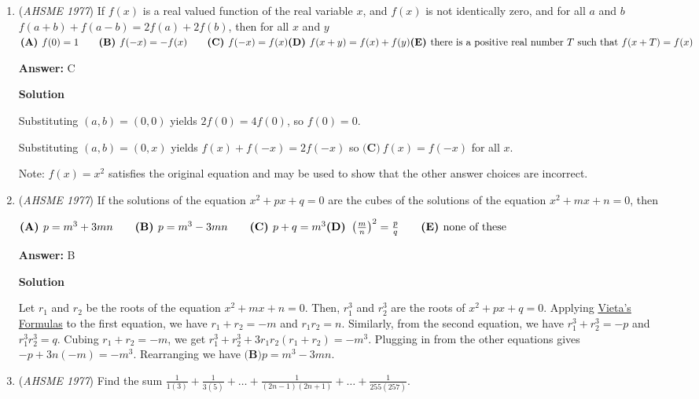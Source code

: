\begin{enumerate}
	\item (\textit{AHSME 1977}) If $f(x)$ is a real valued function of the real variable $x$, and $f(x)$ is not identically zero, 
and for all $a$ and $b$ $f(a+b)+f(a-b)=2f(a)+2f(b)$, then for all $x$ and $y$
$\textbf{(A) }f(0)=1\qquad \textbf{(B) }f(-x)=-f(x)\qquad \textbf{(C) }f(-x)=f(x)\qquad \\ \textbf{(D) }f(x+y)=f(x)+f(y) \qquad \\ \textbf{(E) }\text{there is a positive real number }T\text{ such that }f(x+T)=f(x)$

 \textbf{Answer: }C



\textbf{Solution}

Substituting $(a,b)=(0,0)$ yields $2f(0)=4f(0)$, so $f(0)=0$.

 Substituting $(a,b)=(0,x)$ yields $f(x)+f(-x)=2f(-x)$ so $\boxed{\textbf{(C)}\ f(x)=f(-x)}$ for all $x$.

 Note: $f(x) = x^2$ satisfies the original equation and may be used to show that the other answer choices are incorrect.

 


	\item (\textit{AHSME 1977}) If the solutions of the equation $x^2+px+q=0$ are the cubes of the solutions of the equation $x^2+mx+n=0$, then


 $\textbf{(A) }p=m^3+3mn\qquad \textbf{(B) }p=m^3-3mn\qquad \textbf{(C) }p+q=m^3\qquad\\ \textbf{(D) }\left(\frac{m}{n}\right)^2=\frac{p}{q}\qquad  \textbf{(E) }\text{none of these}$

 \textbf{Answer: }B



\textbf{Solution}

Let $r_1$ and $r_2$ be the roots of the equation $x^2+mx+n=0$. Then, $r_1^3$ and $r_2^3$ are the roots of $x^2+px+q=0$. Applying \href{https://artofproblemsolving.com/wiki/index.php?title=Vieta\%27s\_Formulas}{Vieta's Formulas} to the first equation, we have $r_1 + r_2 = -m$ and $r_1r_2 = n$. Similarly, from the second equation, we have $r_1^3 + r_2^3 = -p$ and $r_1^3r_2^3 = q$. Cubing $r_1 + r_2 = -m$, we get $r_1^3 + r_2^3 + 3r_1r_2(r_1+r_2) = -m^3$. Plugging in from the other equations gives $-p + 3n(-m)=-m^3$. Rearranging we have $\boxed{\textbf{(B)} p=m^3-3mn.}$



	\item (\textit{AHSME 1977}) Find the sum $\frac{1}{1(3)}+\frac{1}{3(5)}+\dots+\frac{1}{(2n-1)(2n+1)}+\dots+\frac{1}{255(257)}$.



\end{enumerate}
